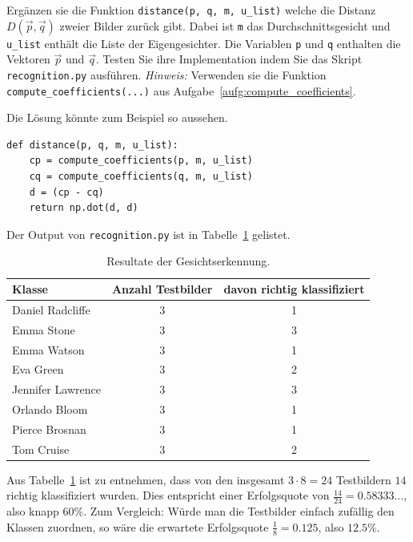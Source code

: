 \begin{aufgabe} \label{aufg:quantification_code}
	Ergänzen sie die Funktion \texttt{distance(p, q, m, u\_list)} welche die Distanz $D\left(\vec p,\vec q\right)$ zweier Bilder zurück gibt.
	Dabei ist \texttt{m} das Durchschnittsgesicht und \texttt{u\_list} enthält die Liste der Eigengesichter.
	Die Variablen \texttt{p} und \texttt{q} enthalten die Vektoren $\vec p$ und $\vec q$.
	Testen Sie ihre Implementation indem Sie das Skript \texttt{recognition.py} ausführen.
	\textit{Hinweis:} Verwenden sie die Funktion \texttt{compute\_coefficients(...)} aus Aufgabe~\ref{aufg:compute_coefficients}.
\end{aufgabe}
\begin{losung}
	Die Lösung könnte zum Beispiel so aussehen.
\begin{lstlisting}[style=python]
def distance(p, q, m, u_list):
	cp = compute_coefficients(p, m, u_list)
	cq = compute_coefficients(q, m, u_list)
	d = (cp - cq)
	return np.dot(d, d)
\end{lstlisting}
Der Output von \texttt{recognition.py} ist in Tabelle~\ref{tab:recognition} gelistet.
\end{losung}
\begin{table}[ht]
	\centering
	\begin{tabular}{|l|c|c|}
		\hline
		\textbf{Klasse} & \textbf{Anzahl Testbilder} & \textbf{davon richtig klassifiziert} \\ \hline
		Daniel Radcliffe & 3 & 1 \\ \hline
		Emma Stone & 3 & 3 \\ \hline
		Emma Watson & 3 & 1 \\ \hline
		Eva Green & 3 & 2 \\ \hline
		Jennifer Lawrence & 3 & 3 \\ \hline
		Orlando Bloom & 3 & 1 \\ \hline
		Pierce Brosnan & 3 & 1 \\ \hline
		Tom Cruise & 3 & 2 \\ \hline
	\end{tabular}
	\caption{Resultate der Gesichtserkennung.}
	\label{tab:recognition}
\end{table}
Aus Tabelle~\ref{tab:recognition} ist zu entnehmen, dass von den insgesamt $3\cdot8=24$ Testbildern $14$ richtig klassifiziert wurden.
Dies entspricht einer Erfolgsquote von $\frac{14}{24}=0.58333\ldots$, also knapp $60\%$.
Zum Vergleich: Würde man die Testbilder einfach zufällig den Klassen zuordnen, so wäre die erwartete Erfolgsquote $\frac{1}{8}=0.125$, also $12.5\%$.